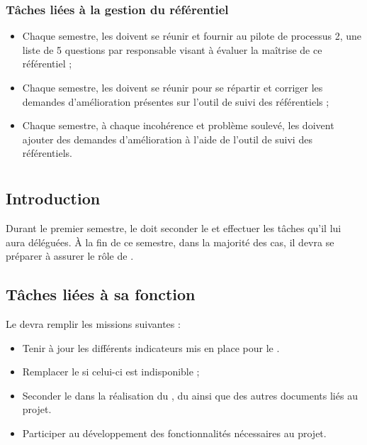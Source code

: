 \subsubsection*{Tâches liées à la gestion du référentiel}

\begin{itemize}
	\item Chaque semestre, les \RQs doivent se réunir et fournir au pilote de processus 2, une liste de 5 questions par responsable visant à évaluer la maîtrise de ce référentiel ;
	\item Chaque semestre, les \RQs doivent se réunir pour se répartir et corriger les demandes d’amélioration présentes sur l’outil de suivi des référentiels ;
	\item Chaque semestre, à chaque incohérence et problème soulevé, les \RQs doivent ajouter des demandes d’amélioration à l’aide de l’outil de suivi des référentiels.
\end{itemize}

\newpage
\section{\RQA}
\subsection*{Introduction}

Durant le premier semestre, le \RQA{} doit seconder le \RQ{} et effectuer les tâches qu’il lui aura déléguées. À la fin de ce semestre, dans la majorité des cas, il devra se préparer à assurer le rôle de \RQ .

\subsection*{Tâches liées à sa fonction}

Le \RQA devra remplir les missions suivantes :
\begin{itemize}
	\item Tenir à jour les différents indicateurs mis en place pour le \PICCourt.
	\item Remplacer le \RQA{} si celui-ci est indisponible ;
	\item Seconder le \RQ{} dans la réalisation du \PQ, du \PGC{} ainsi que des autres documents liés au projet.
        \item Participer au développement des fonctionnalités nécessaires au projet. 
\end{itemize}

